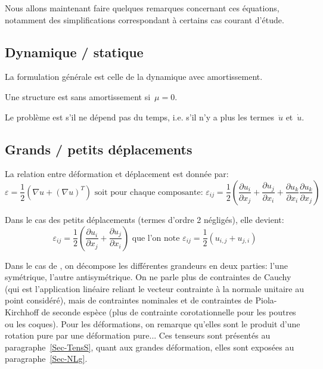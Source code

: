 \medskip
Nous allons maintenant faire quelques remarques concernant ces équations, notamment des simplifications correspondant à certains cas courant d'étude.

\medskip
\subsection{Dynamique / statique}
La formulation générale est celle de la dynamique avec amortissement.

Une structure est sans amortissement si~$\mu=0$.

Le problème est  s'il ne dépend pas du temps, i.e. s'il n'y a plus les termes~$\ddot{u}$ et~$\dot{u}$.

\medskip
\subsection{Grands / petits déplacements}
La relation entre déformation et déplacement est donnée par:
\begin{equation}\varepsilon=\frac12\left(\nabla u+(\nabla u)^T\right)%
\text{ soit pour chaque composante: }
\varepsilon_{ij}=\frac12\left(\frac{\partial u_i}{\partial x_j}+\frac{\partial u_j}{\partial x_i}
+\frac{\partial u_k}{\partial x_i}\frac{\partial u_k}{\partial x_j}
\right)\end{equation}

\medskip
Dans le cas des petits déplacements (termes d'ordre 2 négligés), elle devient:
\begin{equation}
\varepsilon_{ij}=\frac12\left(\frac{\partial u_i}{\partial x_j}+\frac{\partial u_j}{\partial x_i}\right)
\text{ que l'on note }
\varepsilon_{ij}=\frac12(u_{i,j}+u_{j,i})
\end{equation}

Dans le cas de , on décompose les différentes grandeurs en deux parties: l'une symétrique, l'autre antisymétrique. On ne parle plus de contraintes de Cauchy (qui est l'application linéaire reliant le vecteur contrainte à la normale unitaire au point considéré), mais de contraintes nominales et de contraintes de Piola-Kirchhoff de seconde espèce (plus de contrainte corotationnelle pour les poutres ou les coques). Pour les déformations, on remarque qu'elles sont le produit d'une rotation pure par une déformation pure... 
Ces tenseurs sont présentés au paragraphe~\ref{Sec-TensS}, quant aux grandes déformation, elles sont exposées au paragraphe~\ref{Sec-NLg}.

